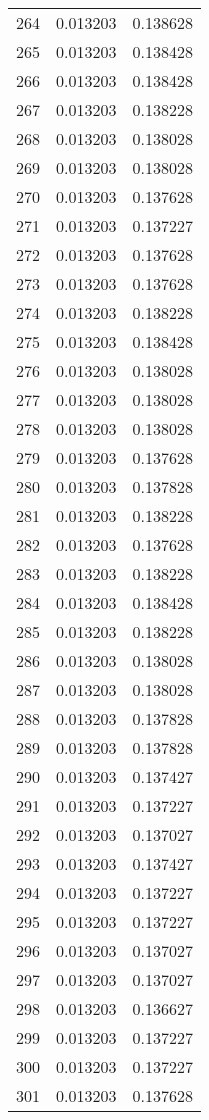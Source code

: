 \begin{longtable}{rrr}
264 & 0.013203 & 0.138628 \\
265 & 0.013203 & 0.138428 \\
266 & 0.013203 & 0.138428 \\
267 & 0.013203 & 0.138228 \\
268 & 0.013203 & 0.138028 \\
269 & 0.013203 & 0.138028 \\
270 & 0.013203 & 0.137628 \\
271 & 0.013203 & 0.137227 \\
272 & 0.013203 & 0.137628 \\
273 & 0.013203 & 0.137628 \\
274 & 0.013203 & 0.138228 \\
275 & 0.013203 & 0.138428 \\
276 & 0.013203 & 0.138028 \\
277 & 0.013203 & 0.138028 \\
278 & 0.013203 & 0.138028 \\
279 & 0.013203 & 0.137628 \\
280 & 0.013203 & 0.137828 \\
281 & 0.013203 & 0.138228 \\
282 & 0.013203 & 0.137628 \\
283 & 0.013203 & 0.138228 \\
284 & 0.013203 & 0.138428 \\
285 & 0.013203 & 0.138228 \\
286 & 0.013203 & 0.138028 \\
287 & 0.013203 & 0.138028 \\
288 & 0.013203 & 0.137828 \\
289 & 0.013203 & 0.137828 \\
290 & 0.013203 & 0.137427 \\
291 & 0.013203 & 0.137227 \\
292 & 0.013203 & 0.137027 \\
293 & 0.013203 & 0.137427 \\
294 & 0.013203 & 0.137227 \\
295 & 0.013203 & 0.137227 \\
296 & 0.013203 & 0.137027 \\
297 & 0.013203 & 0.137027 \\
298 & 0.013203 & 0.136627 \\
299 & 0.013203 & 0.137227 \\
300 & 0.013203 & 0.137227 \\
301 & 0.013203 & 0.137628 \\

\end{longtable}
